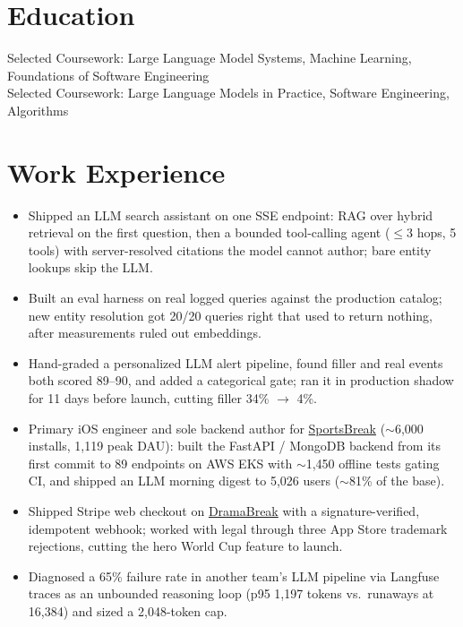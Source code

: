 \documentclass[11pt, letterpaper]{article}
\begin{document}

\section{Education}
Selected Coursework: Large Language Model Systems, Machine Learning, Foundations of Software Engineering\\[1pt]
Selected Coursework: Large Language Models in Practice, Software Engineering, Algorithms

\section{Work Experience}
\begin{itemize}
  \item Shipped an LLM search assistant on one SSE endpoint: RAG over hybrid retrieval on the first question, then a bounded tool-calling agent ($\le$3 hops, 5 tools) with server-resolved citations the model cannot author; bare entity lookups skip the LLM.
  \item Built an eval harness on real logged queries against the production catalog; new entity resolution got 20/20 queries right that used to return nothing, after measurements ruled out embeddings.
  \item Hand-graded a personalized LLM alert pipeline, found filler and real events both scored 89--90, and added a categorical gate; ran it in production shadow for 11 days before launch, cutting filler 34\% $\to$ 4\%.
  \item Primary iOS engineer and sole backend author for \href{https://apps.apple.com/app/id6762649287}{SportsBreak} ($\sim$6{,}000 installs, 1{,}119 peak DAU): built the FastAPI / MongoDB backend from its first commit to 89 endpoints on AWS EKS with $\sim$1{,}450 offline tests gating CI, and shipped an LLM morning digest to 5{,}026 users ($\sim$81\% of the base).
  \item Shipped Stripe web checkout on \href{https://apps.apple.com/app/id6758861738}{DramaBreak} with a signature-verified, idempotent webhook; worked with legal through three App Store trademark rejections, cutting the hero World Cup feature to launch.
  \item Diagnosed a 65\% failure rate in another team's LLM pipeline via Langfuse traces as an unbounded reasoning loop (p95 1{,}197 tokens vs.\ runaways at 16{,}384) and sized a 2{,}048-token cap.
\end{itemize}
\end{document}
